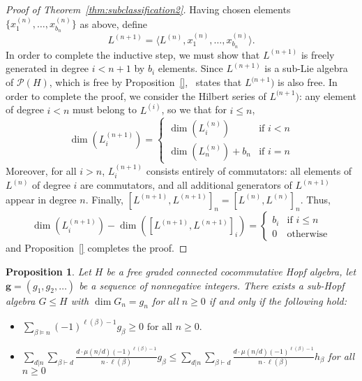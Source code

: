 \documentclass[11pt]{amsart}
\newtheorem{proposition}[theorem]{Proposition}
\theoremstyle{definition}
\numberwithin{equation}{section}
\begin{document}
\begin{proof}[Proof of Theorem~\ref{thm:subclassification2}]
Having chosen elements $\{x^{(n)}_{1}, \ldots, x^{(n)}_{b_{n}}\}$ as above, define
\[
L^{(n+1)} = \langle L^{(n)}, x^{(n)}_{1}, \ldots, x^{(n)}_{b_{n}} \rangle.
\]
In order to complete the inductive step, we must show that $L^{(n+1)}$ is freely generated in degree $i < n+1$ by $b_{i}$ elements.  
Since $L^{(n+1)}$ is a sub-Lie algebra of $\mathcal{P}(H)$, which is free by Proposition~\ref{},~\cite[Theorem 2.2]{MSZ} states that $L^{(n+1})$ is also free.
In order to complete the proof, we consider the Hilbert series of $L^{(n+1})$: any element of degree $i < n$ must belong to $L^{(i)}$, so we that for $i \le n$, 
\[
\dim(L^{(n+1)}_{i}) = \begin{cases}
\dim(L^{(n)}_{i}) & \text{if $i < n$} \\
\dim(L^{(n)}_{n}) + b_{n} & \text{if $i = n$}
\end{cases}
\]
Moreover, for all $i > n$, $L^{(n+1)}_{i}$ consists entirely of commutators: all elements of $L^{(n)}$ of degree $i$ are commutators, and all additional generators of $L^{(n+1)}$ appear in degree $n$.  Finally, $[L^{(n+1)}, L^{(n+1)}]_{n} = [L^{(n)}, L^{(n)}]_{n}$.  Thus,
\[
\dim(L^{(n+1)}_{i}) - \dim([L^{(n+1)}, L^{(n+1)}]_{i}) = \begin{cases}
b_{i} & \text{if $i \le n$} \\
0 & \text{otherwise}
\end{cases}
\]
and Proposition~\ref{} completes the proof.
\end{proof}









\begin{proposition}
    Let $H$ be a free graded connected cocommutative Hopf algebra, let $\mathbf{g} = (g_1,g_2,\ldots )$ be a sequence of nonnegative integers. There exists a sub-Hopf algebra $G \leq H$ with $\dim G_n = g_n$ for all $n \geq 0$ if and only if the following hold:
    \begin{itemize}
        \item[i)] $\displaystyle \sum_{\beta \vDash n} (-1)^{\ell(\beta)-1} g_\beta \geq 0 \text{ for all } n \geq 0.$
        \item[ii)] $\displaystyle \sum_{d|n} \sum_{\beta \vdash d} \frac{d\cdot \mu(n/d) (-1)^{\ell(\beta)-1}}{n \cdot \ell(\beta)} g_\beta \leq \sum_{d|n} \sum_{\beta \vdash d} \frac{d\cdot \mu(n/d) (-1)^{\ell(\beta)-1}}{n \cdot \ell(\beta)} h_\beta$ for all $n \geq 0$
    \end{itemize}
\end{proposition}


{}
\end{document}
